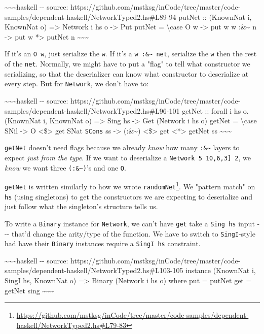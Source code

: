 \documentclass[]{article}
\renewcommand{\href}[2]{#2\footnote{\url{#1}}}
\begin{document}
\textasciitilde{}\textasciitilde{}\textasciitilde{}haskell -\/- source:
https://github.com/mstksg/inCode/tree/master/code-samples/dependent-haskell/NetworkTyped2.hs\#L89-94
putNet :: (KnownNat i, KnownNat o) =\textgreater{} Network i hs o
-\textgreater{} Put putNet = \textbackslash{}case O w -\textgreater{} put w w
:\&\textasciitilde{} n -\textgreater{} put w *\textgreater{} putNet n
\textasciitilde{}\textasciitilde{}\textasciitilde{}

If it's an \texttt{O\ w}, just serialize the \texttt{w}. If it's a
\texttt{w\ :\&\textasciitilde{}\ net}, serialize the \texttt{w} then the rest of
the \texttt{net}. Normally, we might have to put a "flag" to tell what
constructor we serializing, so that the deserializer can know what constructor
to deserialize at every step. But for \texttt{Network}, we don't have to:

\textasciitilde{}\textasciitilde{}\textasciitilde{}haskell -\/- source:
https://github.com/mstksg/inCode/tree/master/code-samples/dependent-haskell/NetworkTyped2.hs\#L96-101
getNet :: forall i hs o. (KnownNat i, KnownNat o) =\textgreater{} Sing hs
-\textgreater{} Get (Network i hs o) getNet = \textbackslash{}case SNil
-\textgreater{} O \textless{}\$\textgreater{} get SNat \texttt{SCons} ss
-\textgreater{} (:\&\textasciitilde{}) \textless{}\$\textgreater{} get
\textless{}*\textgreater{} getNet ss
\textasciitilde{}\textasciitilde{}\textasciitilde{}

\texttt{getNet} doesn't need flags because we already \emph{know} how many
\texttt{:\&\textasciitilde{}} layers to expect \emph{just from the type}. If we
want to deserialize a \texttt{Network\ 5\ \textquotesingle{}{[}10,6,3{]}\ 2}, we
\emph{know} we want three \texttt{(:\&\textasciitilde{})}'s and one \texttt{O}.

\texttt{getNet} is written similarly to how we wrote
\href{https://github.com/mstksg/inCode/tree/master/code-samples/dependent-haskell/NetworkTyped2.hs\#L79-83}{\texttt{randomNet\textquotesingle{}}}.
We "pattern match" on \texttt{hs} (using singletons) to get the constructors we
are expecting to deserialize and just follow what the singleton's structure
tells us.

To write a \texttt{Binary} instance for \texttt{Network}, we can't have
\texttt{get} take a \texttt{Sing\ hs} input -\/-\/- that'd change the arity/type
of the function. We have to switch to \texttt{SingI}-style had have their
\texttt{Binary} instances require a \texttt{SingI\ hs} constraint.

\textasciitilde{}\textasciitilde{}\textasciitilde{}haskell -\/- source:
https://github.com/mstksg/inCode/tree/master/code-samples/dependent-haskell/NetworkTyped2.hs\#L103-105
instance (KnownNat i, SingI hs, KnownNat o) =\textgreater{} Binary (Network i hs
o) where put = putNet get = getNet sing
\textasciitilde{}\textasciitilde{}\textasciitilde{}
\end{document}
